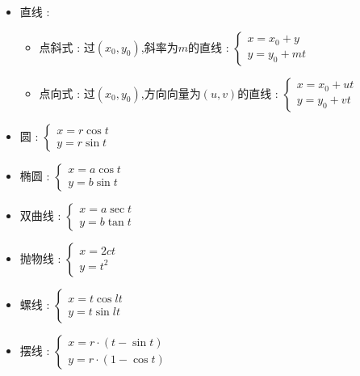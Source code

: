 \documentclass[UTF8,12pt]{ctexbook}
\begin{document}
{{{{      \begin{itemize}
        \item {
              直线 :
              \begin{itemize}
                \item 点斜式 : 过$(x_0,y_0)$,斜率为$m$的直线 : $\begin{cases}
                          x = x_0 + y \\
                          y = y_0 + mt
                        \end{cases}$
                \item 点向式 : 过$(x_0,y_0)$,方向向量为$(u,v)$的直线 : $\begin{cases}
                          x = x_0 + ut \\
                          y = y_0 + vt
                        \end{cases}$
              \end{itemize}
              }
        \item 圆 : $\begin{cases}
                  x = r\cos t \\
                  y = r\sin t
                \end{cases}$
        \item 椭圆 : $\begin{cases}
                  x = a\cos t \\
                  y = b\sin t
                \end{cases}$
        \item 双曲线 : $\begin{cases}
                  x = a\sec t \\
                  y = b\tan t
                \end{cases}$
        \item 抛物线 : $\begin{cases}
                  x = 2ct \\
                  y = t^2
                \end{cases}$
        \item 螺线 : $\begin{cases}
                  x = t\cos lt \\
                  y = t\sin lt
                \end{cases}$
        \item 摆线 : $\begin{cases}
                  x = r \cdot (t - \sin t) \\
                  y = r \cdot (1 - \cos t)
                \end{cases}$
      \end{itemize}

}}}}
\end{document}
